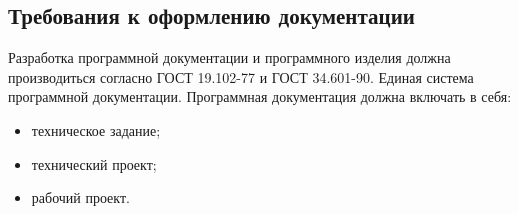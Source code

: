 \subsection{Требования к оформлению документации}

Разработка программной документации и программного изделия должна производиться согласно ГОСТ 19.102-77 и ГОСТ 34.601-90. Единая система программной документации.
Программная документация должна включать в себя:
\begin{itemize}
	\item техническое задание;
	\item технический проект;
	\item рабочий проект.
\end{itemize}